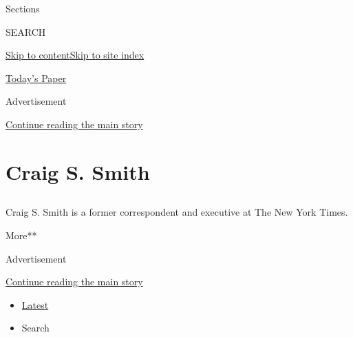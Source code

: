 Sections

SEARCH

\protect\hyperlink{site-content}{Skip to
content}\protect\hyperlink{site-index}{Skip to site index}

\href{https://myaccount.nytimes.com/auth/login?response_type=cookie\&client_id=vi}{}

\href{https://www.nytimes.com/section/todayspaper}{Today's Paper}

Advertisement

\protect\hyperlink{after-top}{Continue reading the main story}

\hypertarget{craig-s-smith}{%
\section{Craig S. Smith}\label{craig-s-smith}}

\subsection{}

Craig S. Smith is a former correspondent and executive at The New York
Times.

More**

Advertisement

\protect\hyperlink{after-mid1}{Continue reading the main story}

\begin{itemize}
\tightlist
\item
  \protect\hyperlink{stream-panel}{Latest}
\item
  Search
\end{itemize}

